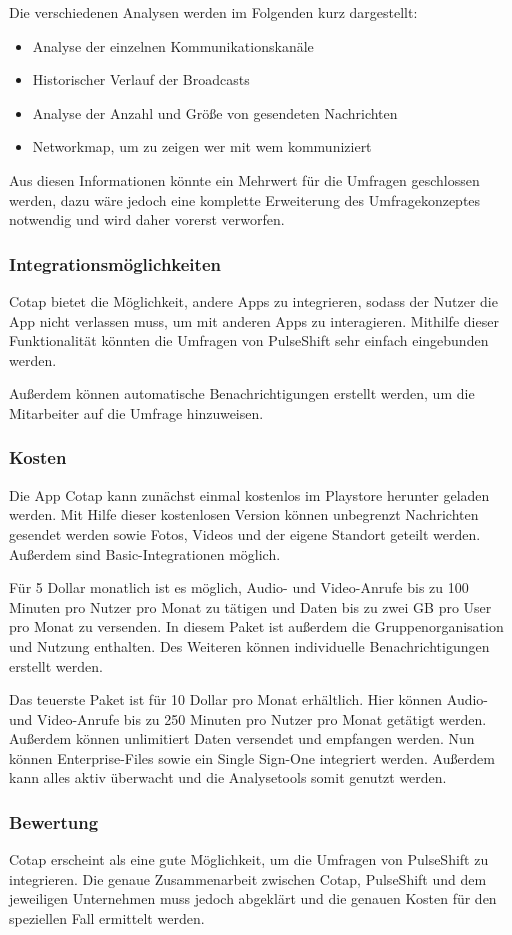 Die verschiedenen Analysen werden im Folgenden kurz dargestellt: 

\begin{itemize}
\item Analyse der einzelnen Kommunikationskanäle
\item Historischer Verlauf der Broadcasts
\item Analyse der Anzahl und Größe von gesendeten Nachrichten
\item Networkmap, um zu zeigen wer mit wem kommuniziert
\end{itemize}

Aus diesen Informationen könnte ein Mehrwert für die Umfragen geschlossen werden, dazu wäre jedoch eine komplette Erweiterung des Umfragekonzeptes notwendig und wird daher vorerst verworfen.

\subsubsection{Integrationsmöglichkeiten}
Cotap bietet die Möglichkeit, andere Apps zu integrieren, sodass der Nutzer die App nicht verlassen muss, um mit anderen Apps zu interagieren. Mithilfe dieser Funktionalität könnten die Umfragen von PulseShift sehr einfach eingebunden werden. 

Außerdem können automatische Benachrichtigungen erstellt werden, um die Mitarbeiter auf die Umfrage hinzuweisen.

\subsubsection{Kosten}
Die App Cotap kann zunächst einmal kostenlos im Playstore herunter geladen werden. Mit Hilfe dieser kostenlosen Version können unbegrenzt Nachrichten gesendet werden sowie Fotos, Videos und der eigene Standort geteilt werden. Außerdem sind Basic-Integrationen möglich. 

Für 5 Dollar monatlich ist es möglich, Audio- und Video-Anrufe bis zu 100 Minuten pro Nutzer pro Monat zu tätigen und Daten bis zu zwei GB pro User pro Monat zu versenden. In diesem Paket ist außerdem die Gruppenorganisation und Nutzung enthalten. Des Weiteren können individuelle Benachrichtigungen erstellt werden.

Das teuerste Paket ist für 10 Dollar pro Monat erhältlich. Hier können Audio- und Video-Anrufe bis zu 250 Minuten pro Nutzer pro Monat getätigt werden. Außerdem können unlimitiert Daten versendet und empfangen werden. Nun können Enterprise-Files sowie ein Single Sign-One integriert werden. Außerdem kann alles aktiv überwacht und die Analysetools somit genutzt werden.

\subsubsection{Bewertung}
Cotap erscheint als eine gute Möglichkeit, um die Umfragen von PulseShift zu integrieren. Die genaue Zusammenarbeit zwischen Cotap, PulseShift und dem jeweiligen Unternehmen muss jedoch abgeklärt und die genauen Kosten für den speziellen Fall ermittelt werden.
